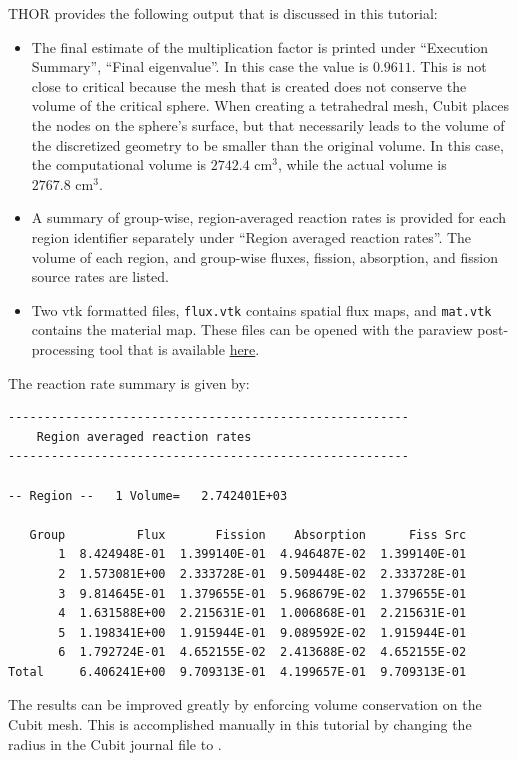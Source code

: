 THOR provides the following output that is discussed in this tutorial:
\begin{itemize}
    \item The final estimate of the multiplication factor is printed under ``Execution Summary'', ``Final eigenvalue''. In this case the value is $0.9611$. This is not close to critical because the mesh that
    is created does not conserve the volume of the critical sphere. When creating a tetrahedral mesh,
    Cubit places the nodes on the sphere's surface, but that necessarily leads to the volume of the discretized geometry to be smaller than the original volume. In this case, the computational volume
    is $2742.4\text{ cm}^3$, while the actual volume is $2767.8\text{ cm}^3$.
    \item A summary of group-wise, region-averaged reaction rates is provided for each region identifier separately under ``Region averaged reaction rates''. The volume of each region, and group-wise fluxes, fission, absorption, and fission source rates are listed.
    \item Two vtk formatted files, \verb"flux.vtk" contains spatial flux maps, and \verb"mat.vtk" contains the material map. These files can be opened with the paraview post-processing tool that is available \href{https://www.paraview.org/download/}{here}.
\end{itemize}

The reaction rate summary is given by:
\begin{verbatim}
--------------------------------------------------------
    Region averaged reaction rates
--------------------------------------------------------

-- Region --   1 Volume=   2.742401E+03

   Group          Flux       Fission    Absorption      Fiss Src
       1  8.424948E-01  1.399140E-01  4.946487E-02  1.399140E-01
       2  1.573081E+00  2.333728E-01  9.509448E-02  2.333728E-01
       3  9.814645E-01  1.379655E-01  5.968679E-02  1.379655E-01
       4  1.631588E+00  2.215631E-01  1.006868E-01  2.215631E-01
       5  1.198341E+00  1.915944E-01  9.089592E-02  1.915944E-01
       6  1.792724E-01  4.652155E-02  2.413688E-02  4.652155E-02
Total     6.406241E+00  9.709313E-01  4.199657E-01  9.709313E-01
\end{verbatim}

The results can be improved greatly by enforcing volume conservation on the Cubit mesh. This is accomplished manually in this tutorial by changing the radius in the Cubit journal file to .